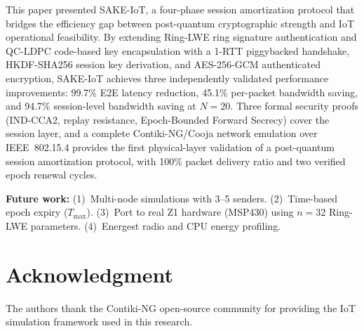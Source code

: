 \documentclass[conference]{IEEEtran}
\newcommand{\Tmax}{T_{\max}}
\begin{document}
This paper presented SAKE-IoT, a four-phase session amortization
protocol that bridges the efficiency gap between post-quantum
cryptographic strength and IoT operational feasibility. By extending
Ring-LWE ring signature authentication and QC-LDPC code-based key
encapsulation with a 1-RTT piggybacked handshake, HKDF-SHA256
session key derivation, and AES-256-GCM authenticated encryption,
SAKE-IoT achieves three independently validated performance
improvements: 99.7\% E2E latency reduction, 45.1\% per-packet
bandwidth saving, and 94.7\% session-level bandwidth saving at
$N{=}20$. Three formal security proofs (IND-CCA2, replay
resistance, Epoch-Bounded Forward Secrecy) cover the session layer,
and a complete Contiki-NG/Cooja network emulation over IEEE~802.15.4
provides the first physical-layer validation of a post-quantum
session amortization protocol, with 100\% packet delivery ratio and
two verified epoch renewal cycles.

\textbf{Future work:} (1)~Multi-node simulations with 3--5 senders.
(2)~Time-based epoch expiry ($\Tmax$). (3)~Port to real Z1 hardware
(MSP430) using $n{=}32$ Ring-LWE parameters.
(4)~Energest radio and CPU energy profiling.

\section*{Acknowledgment}

The authors thank the Contiki-NG open-source community for providing
the IoT simulation framework used in this research.
\end{document}
